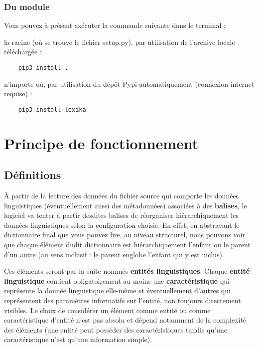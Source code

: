 \documentclass[10pt]{report}
\begin{document}
\subsection{Du module}

Vous pouvez à présent exécuter la commande suivante dans le terminal :

\bigskip
\begin{itemize}
\begin{minipage}{0.45\linewidth}
    \item la racine (où se trouve le fichier setup.py), par utilisation de l’archive locale téléchargée :
    \begin{verbatim}
    pip3 install .
    \end{verbatim}
\end{minipage}\hfill
\begin{minipage}{0.45\linewidth}
    \item n’importe où, par utilisation du dépôt Pypi automatiquement (connexion internet requise) :
    \begin{verbatim}
    pip3 install lexika
    \end{verbatim}
\end{minipage}
\end{itemize}

\chapter{Principe de fonctionnement}

\section{Définitions}

À partir de la lecture des données du fichier source qui comporte les données linguistiques (éventuellement aussi des métadonnées) associées à des \textbf{balises}, le logiciel va tenter à partir desdites balises de réorganiser hiérarchiquement les données linguistiques selon la configuration choisie. En effet, en abstrayant le dictionnaire final que vous pouvez lire, au niveau structurel, nous pouvons voir que chaque élément dudit dictionnaire est hiérarchiquement l’enfant ou le parent d’un autre (au sens inclusif : le parent englobe l’enfant qui y est inclus).

Ces éléments seront par la suite nommés \textbf{entités linguistiques}. Chaque \textbf{entité linguistique} contient obligatoirement au moins une \textbf{caractéristique} qui représente la donnée linguistique elle-même et éventuellement d’autres qui représentent des paramètres informatifs sur l’entité, non toujours directement visibles. Le choix de considérer un élément comme entité ou comme caractéristique d’entité n’est pas absolu et dépend notamment de la complexité des éléments (une entité peut posséder des caractéristiques tandis qu’une caractéristique n’est qu’une information simple).
\end{document}
